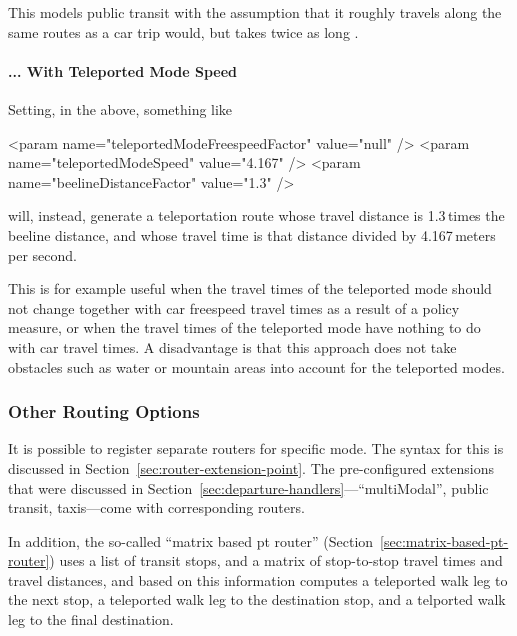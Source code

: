 This models public transit with the assumption that it roughly travels along the same routes as a car trip would, but takes twice as long \citep[\cf][]{Reinhold2006Konzeptzurintegrierten}.

\paragraph{... With Teleported Mode Speed}  Setting, in the above, something like
\begin{xml}
      <param name="teleportedModeFreespeedFactor" value="null" />
      <param name="teleportedModeSpeed" value="4.167" />
      <param name="beelineDistanceFactor" value="1.3" />
\end{xml}
will, instead, generate a teleportation route whose travel distance is 1.3\,times the beeline distance, and whose travel time is that distance divided by 4.167\,meters per second.

This is for example useful when the travel times of the teleported mode should not change together with car freespeed travel times as a result of a policy measure, or when the travel times of the teleported mode have nothing to do with car travel times.  A disadvantage is that this approach does not take obstacles such as water or mountain areas into account for the teleported modes.

\subsubsection{Other Routing Options}
It is possible to register separate routers for specific mode.  The syntax for this is discussed in Section~\ref{sec:router-extension-point}.  The pre-configured extensions that were discussed in Section~\ref{sec:departure-handlers}---``multiModal'', public transit, taxis---come with corresponding routers.  

In addition, the so-called ``matrix based pt router'' (Section~\ref{sec:matrix-based-pt-router}) uses a list of transit stops, and a matrix of stop-to-stop travel times and travel distances, and based on this information computes a teleported walk leg to the next stop, a teleported walk leg to the destination stop, and a telported walk leg to the final destination.

